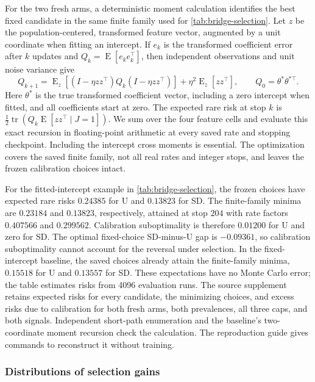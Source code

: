 \documentclass{alt2027}
\DeclareMathOperator{\E}{E}
\begin{document}
For the two fresh arms, a deterministic moment calculation identifies the best
fixed candidate in the same finite family used for \cref{tab:bridge-selection}.
Let $z$ be the population-centered, transformed feature vector, augmented by a
unit coordinate when fitting an intercept. If $e_k$ is the transformed
coefficient error after $k$ updates and $Q_k = \E[e_k e_k^\top]$, then
independent observations and unit noise variance give
\[
  Q_{k+1} = \E_z[(I - \eta zz^\top)Q_k(I - \eta zz^\top)]
            + \eta^2\E_z[zz^\top], \qquad Q_0
          = \theta^*\theta^{*\top}.
\]
Here $\theta^*$ is the true transformed coefficient vector, including a zero
intercept when fitted, and all coefficients start at zero. The expected rare
risk at stop $k$ is $\tfrac12\operatorname{tr}(Q_k\E[zz^\top\mid J=1])$. We sum
over the four feature cells and evaluate this exact recursion in floating-point
arithmetic at every saved rate and stopping checkpoint. Including the intercept
cross moments is essential. The optimization covers the saved finite family, not
all real rates and integer stops, and leaves the frozen calibration choices
intact.

For the fitted-intercept example in \cref{tab:bridge-selection}, the frozen
choices have expected rare risks $0.24385$ for U and $0.13823$ for SD\@. The
finite-family minima are $0.23184$ and $0.13823$, respectively, attained at stop
$204$ with rate factors $0.407566$ and $0.299562$. Calibration suboptimality is
therefore $0.01200$ for U and zero for SD\@. The optimal fixed-choice SD-minus-U
gap is $-0.09361$, so calibration suboptimality cannot account for the reversal
under selection. In the fixed-intercept baseline, the saved choices already
attain the finite-family minima, $0.15518$ for U and $0.13557$ for SD\@. These
expectations have no Monte Carlo error; the table estimates risks from 4096
evaluation runs. The source supplement retains expected risks for every
candidate, the minimizing choices, and excess risks due to calibration for both
fresh arms, both prevalences, all three caps, and both signals. Independent
short-path enumeration and the baseline's two-coordinate moment recursion check
the calculation. The reproduction guide gives commands to reconstruct it without
training.

\subsubsection{Distributions of selection gains}
\label{sec:bridge-gains}
\end{document}
